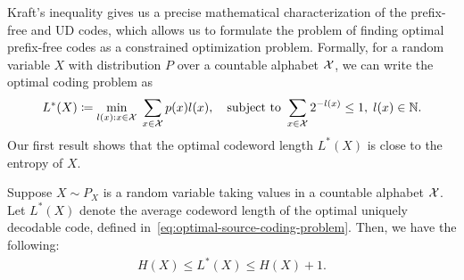     Kraft's inequality gives us a precise mathematical characterization of the prefix-free and UD codes, which allows us to formulate the problem of finding optimal prefix-free codes as a constrained optimization problem. Formally,  for a random variable $X$ with distribution $P$ over a countable alphabet $\mathcal{X}$, we can write the optimal coding problem as 
    \begin{align}
        \label{eq:optimal-source-coding-problem}
        L^*(X) \coloneqq \min_{ l(x): x \in \mathcal{X}  } \; \sum_{x \in \mathcal{X}} p(x) l(x), \quad \text{subject to } \sum_{x \in \mathcal{X}}2^{-l(x)} \leq 1, \; l(x) \in \mathbb{N}. 
    \end{align}
    Our first result shows that the optimal codeword length $L^*(X)$ is close to the entropy of $X$. 
    \begin{theorem}
        \label{thm:source-coding-theorem} Suppose $X \sim P_X$ is a random variable taking values in a countable alphabet $\mathcal{X}$. Let $L^*(X)$ denote the average codeword length of the optimal uniquely decodable code, defined in~\eqref{eq:optimal-source-coding-problem}. Then, we have the following: 
        \begin{align}
            H(X) \leq L^*(X) \leq H(X) + 1.  \label{eq:source-coding-thm}
        \end{align}
    \end{theorem}   
